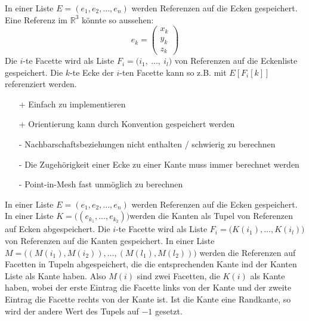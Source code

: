 \begin{Definition}[Eckenliste]
In einer Liste $E = (e_1, e_2, \hdots, e_n)$ werden Referenzen auf die Ecken 
gespeichert. 
Eine Referenz im $\mathbb{R}^3$ könnte so aussehen: 
\begin{equation*}
    e_k = \begin{pmatrix}
        x_k \\
        y_k \\
        z_k
    \end{pmatrix}
\end{equation*}
Die $i$-te Facette wird als Liste $F_i = \bigl( i_1,~\hdots,~i_l  \bigr)$ von 
Referenzen auf die Eckenliste gespeichert. 
Die $k$-te Ecke der $i$-ten Facette kann so z.B. mit $E[F_i[k]]$ referenziert 
werden. 
\end{Definition}
\begin{multicols}{2}[]
    \begin{itemize}
        \item[+] Einfach zu implementieren
        \item[+] Orientierung kann durch Konvention gespeichert werden
        \item[-] Nachbarschaftsbeziehungen nicht enthalten / schwierig zu berechnen
        \item[-] Die Zugehörigkeit einer Ecke zu einer Kante muss immer berechnet werden
        \item[-] Point-in-Mesh fast unmöglich zu berechnen
    \end{itemize}
\end{multicols}

\begin{Definition}[Kantenliste]
In einer Liste $E = (e_1, e_2, \hdots, e_n)$ werden Referenzen auf die Ecken gespeichert. In einer Liste $K=\bigl(   (e_{k_1},   \hdots,  e_{k_2} ) \bigr)$werden die Kanten als Tupel von Referenzen auf Ecken abgespeichert. Die $i$-te Facette wird als Liste $F_i = \bigl( K(i_1), \hdots , K(i_l)  \bigr)$  von  Referenzen auf die Kanten  gespeichert. In einer Liste
$M=  \bigl(    (M(i_1), M(i_2) ), \hdots  ,(M(l_1), M(l_2) )   \bigr )$ werden die Referenzen auf Facetten in Tupeln abgespeichert, die die entsprechenden Kante ind der Kanten Liste als Kante haben.
Also $M(i)$ sind zwei Facetten, die $K(i)$ als Kante haben, wobei der erste Eintrag die Facette links von der Kante und der zweite Eintrag die Facette rechts von der Kante ist. 
Ist die Kante eine Randkante, so wird der andere Wert des Tupels auf  $-1$ gesetzt.
\end{Definition}

